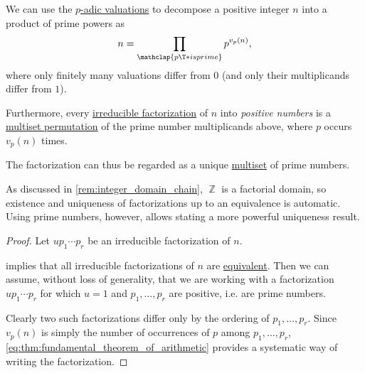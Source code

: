 \begin{theorem}\label{thm:fundamental_theorem_of_arithmetic}
  We can use the \hyperref[def:padic_valuation]{\( p \)-adic valuations} to decompose a positive integer \( n \) into a product of prime powers as
  \begin{equation}\label{eq:thm:fundamental_theorem_of_arithmetic}
    n = \prod_{\mathclap{p \T*{is prime}}} p^{v_p(n)},
  \end{equation}
  where only finitely many valuations differ from \( 0 \) (and only their multiplicands differ from \( 1 \)).

  Furthermore, every \hyperref[def:irreducible_factorization]{irreducible factorization} of \( n \) into \emph{positive numbers} is a \hyperref[def:multiset_permutation]{multiset permutation} of the prime number multiplicands above, where \( p \) occurs \( v_p(n) \) times.
\end{theorem}
\begin{comments}
  \item The factorization can thus be regarded as a unique \hyperref[def:multiset]{multiset} of prime numbers.

  \item As discussed in \cref{rem:integer_domain_chain}, \( \BbbZ \) is a factorial domain, so existence and uniqueness of factorizations up to an equivalence is automatic. Using prime numbers, however, allows stating a more powerful uniqueness result.
\end{comments}
\begin{proof}
  Let \( u p_1 \cdots p_r \) be an irreducible factorization of \( n \).

   implies that all irreducible factorizations of \( n \) are \hyperref[def:irreducible_factorization/equivalent]{equivalent}. Then we can assume, without loss of generality, that we are working with a factorization \( u p_1 \cdots p_r \) for which \( u = 1 \) and \( p_1, \ldots, p_r \) are positive, i.e. are prime numbers.

  Clearly two such factorizations differ only by the ordering of \( p_1, \ldots, p_r \). Since \( v_p(n) \) is simply the number of occurrences of \( p \) among \( p_1, \ldots, p_r \), \eqref{eq:thm:fundamental_theorem_of_arithmetic} provides a systematic way of writing the factorization.
\end{proof}

